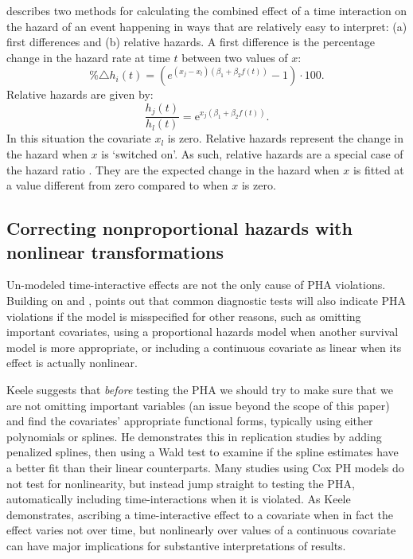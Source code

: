 \documentclass[nojss]{jss}\usepackage[]{graphicx}\usepackage[]{color}
\begin{document}
\cite{Licht2011} describes two methods for calculating the combined effect of a time interaction on the hazard of an event happening in ways that are relatively easy to interpret: (a) first differences and (b) relative hazards. A first difference is the percentage change in the hazard rate at time $t$ between two values of $x$:
%
\begin{equation}
    \%\triangle h_{i}(t) = (e^{(x_{j} - x_{l})(\beta_{1} + \beta_{2}f(t))} - 1) \cdot 100.
\end{equation}
%
Relative hazards are given by:
%
\begin{equation}
    \frac{h_{j}(t)}{h_{l}(t)} = \mathrm{e}^{x_{j}(\beta_{1} + \beta_{2}f(t))}.
\end{equation}
%
In this situation the covariate $x_{l}$ is zero. Relative hazards represent the change in the hazard when $x$ is `switched on'. As such, relative hazards are a special case of the hazard ratio \citep[p. 231]{Licht2011}. They are the expected change in the hazard when $x$ is fitted at a value different from zero compared to when $x$ is zero.

\subsection[Nonproportional and nonlinear effects]{Correcting nonproportional hazards with nonlinear transformations}

Un-modeled time-interactive effects are not the only cause of PHA violations. Building on \cite{Grambsch1994} and \cite{Therneau2000}, \cite{Keele2010} points out that common diagnostic tests will also indicate PHA violations if the model is misspecified for other reasons, such as omitting important covariates, using a proportional hazards model when another survival model is more appropriate, or including a continuous covariate as linear when its effect is actually nonlinear.

Keele suggests that \emph{before} testing the PHA we should try to make sure that we are not omitting important variables (an issue beyond the scope of this paper) and find the covariates' appropriate functional forms, typically using either polynomials or splines. He demonstrates this in replication studies by adding penalized splines, then using a Wald test to examine if the spline estimates have a better fit than their linear counterparts. Many studies using Cox PH models do not test for nonlinearity, but instead jump straight to testing the PHA, automatically including time-interactions when it is violated. As Keele \citeyearpar{Keele2010} demonstrates, ascribing a time-interactive effect to a covariate when in fact the effect varies not over time, but nonlinearly over values of a continuous covariate can have major implications for substantive interpretations of results.
\end{document}
